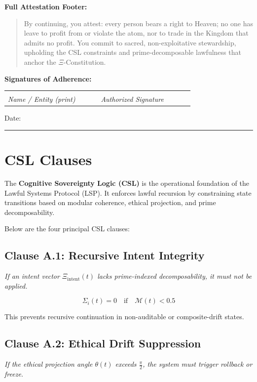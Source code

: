 \documentclass[12]{amsart}
\theoremstyle{plain}
\begin{document}
\noindent
\textbf{Full Attestation Footer:}
\begin{quote}
    By continuing, you attest: every person bears a right to Heaven; no one has leave to profit from or violate the atom, nor to trade in the Kingdom that admits no profit. You commit to sacred, non-exploitative stewardship, upholding the CSL constraints and prime-decomposable lawfulness that anchor the $\Xi$-Constitution.
\end{quote}

\vspace{1em}
\noindent
\textbf{Signatures of Adherence:}
\vspace{2em}

\begin{tabular}{p{0.4\linewidth}p{0.4\linewidth}}
\hrulefill & \hrulefill \\
\textit{Name / Entity (print)} & \textit{Authorized Signature}
\end{tabular}

\vspace{1.5em}
\noindent
Date: \rule{0.3\linewidth}{0.4pt}

\newpage 
\appendix

\section{CSL Clauses}

The \textbf{Cognitive Sovereignty Logic (CSL)} is the operational foundation of the Lawful Systems Protocol (LSP). It enforces lawful recursion by constraining state transitions based on modular coherence, ethical projection, and prime decomposability.

Below are the four principal CSL clauses:

\subsection*{Clause A.1: Recursive Intent Integrity}
\textit{If an intent vector $\Xi_{\text{intent}}(t)$ lacks prime-indexed decomposability, it must not be applied.}

\begin{equation}
\Sigma_i(t) = 0 \quad \text{if} \quad \mathcal{M}(t) < 0.5
\end{equation}

This prevents recursive continuation in non-auditable or composite-drift states.

\subsection*{Clause A.2: Ethical Drift Suppression}
\textit{If the ethical projection angle $\theta(t)$ exceeds $\frac{\pi}{2}$, the system must trigger rollback or freeze.}
\end{document}
